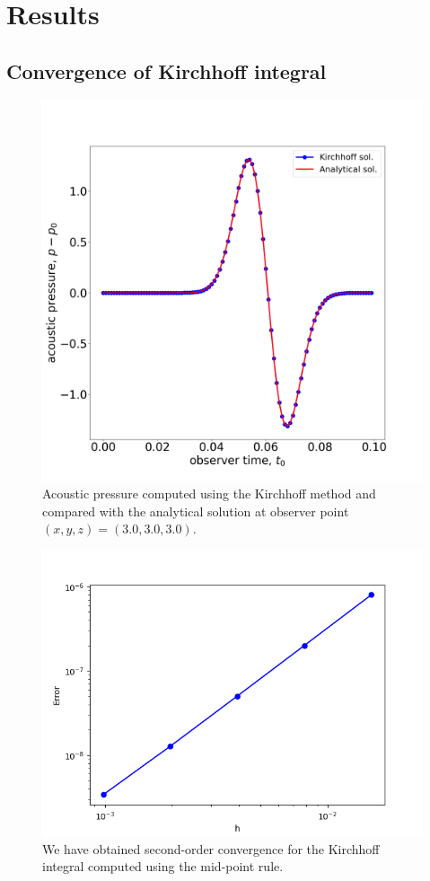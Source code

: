 \documentclass[12pt]{article}
\begin{document}
\section{Results}
\subsection{Convergence of Kirchhoff integral}
\begin{figure}[h!]
	\centering
	\includegraphics[scale=0.3]{images/Pressure.png}
	\caption{Acoustic pressure computed using the Kirchhoff method and compared with the analytical solution at observer point $(x, y, z) = (3.0, 3.0, 3.0).$}
	\label{comparison}
\end{figure}
\begin{figure}[h!]
	\centering
	\includegraphics[scale=0.6]{images/convergence.png}
	\caption{We have obtained second-order convergence for the Kirchhoff integral computed using the mid-point rule.}
	\label{convergence}
\end{figure}
\end{document}
